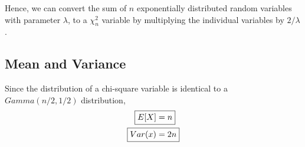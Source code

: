 \documentclass[../probability-notes.tex]{subfiles}
\begin{document}
    Hence, we can convert the sum of $n$ exponentially distributed random variables with parameter $\lambda$, to a $\chi^{2}_{n}$ variable by multiplying the individual variables by $2/\lambda$.

    \subsection{Mean and Variance}
    Since the distribution of a chi-square variable is identical to a $Gamma(n/2, 1/2)$ distribution,
    \begin{align*}
        \Aboxed{E[X] &= n}\\
        \Aboxed{Var(x) &= 2n}
    \end{align*}
\end{document}
